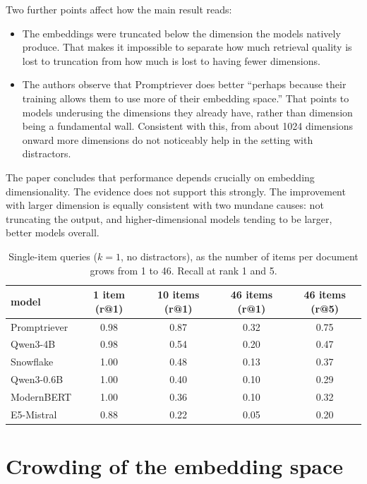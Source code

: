 \documentclass[11pt]{article}
\begin{document}
Two further points affect how the main result reads:

\begin{itemize}
  \item The embeddings were truncated below the dimension the models natively produce. That makes it impossible to separate how much retrieval quality is lost to truncation from how much is lost to having fewer dimensions.
  \item The authors observe that Promptriever does better ``perhaps because their training allows them to use more of their embedding space.'' That points to models underusing the dimensions they already have, rather than dimension being a fundamental wall. Consistent with this, from about 1024 dimensions onward more dimensions do not noticeably help in the setting with distractors.
\end{itemize}

The paper concludes that performance depends crucially on embedding dimensionality. The evidence does not support this strongly. The improvement with larger dimension is equally consistent with two mundane causes: not truncating the output, and higher-dimensional models tending to be larger, better models overall.

\begin{table}[h]
\centering
\caption{Single-item queries ($k=1$, no distractors), as the number of items per document grows from 1 to 46. Recall at rank 1 and 5.}
\label{tab:items}
\begin{tabular}{lcccc}
\toprule
model & 1 item (r@1) & 10 items (r@1) & 46 items (r@1) & 46 items (r@5) \\
\midrule
Promptriever & 0.98 & 0.87 & 0.32 & 0.75 \\
Qwen3-4B     & 0.98 & 0.54 & 0.20 & 0.47 \\
Snowflake    & 1.00 & 0.48 & 0.13 & 0.37 \\
Qwen3-0.6B   & 1.00 & 0.40 & 0.10 & 0.29 \\
ModernBERT   & 1.00 & 0.36 & 0.10 & 0.32 \\
E5-Mistral   & 0.88 & 0.22 & 0.05 & 0.20 \\
\bottomrule
\end{tabular}
\end{table}

\section{Crowding of the embedding space}
\end{document}
